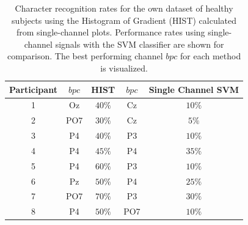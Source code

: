 \documentclass[utf8]{frontiersSCNS} %
\begin{document}
\begin{table}[htb]
\caption{Character recognition rates for the own dataset of healthy subjects using the Histogram of Gradient (HIST) calculated from  single-channel plots.  Performance rates using single-channel signals with the SVM classifier are shown for comparison.  The best performing channel $bpc$ for each method is visualized.}
\centering
\begin{tabular}{c|cc|cc}
\toprule
\textbf{Participant}	&  $bpc$	&  HIST &  $bpc$	&  Single Channel SVM \\
\midrule
1     &     Oz   &   $40\%$  &  Cz   &  $10\%$    \\
2     &     PO7   &   $30\%$      &  Cz   & $5\%$   \\
3     &     P4   &   $40\%$    &  P3   & $10\%$    \\
4     &     P4 &   $45\%$    &  P4   & $35\%$     \\
5     &     P4 &   $60\%$  &  P3   & $10\%$     \\
6     &     Pz &   $50\%$ &  P4   & $25\%$     \\
7     &     PO7 &   $70\%$  &  P3   & $30\%$     \\
8     &     P4 &   $50\%$    &  PO7   & $10\%$    \\

\end{tabular}
\label{tab:resultsown}
\end{table}
\end{document}

